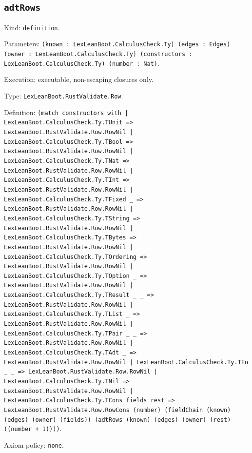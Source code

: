 \documentclass[11pt]{article}
\begin{document}
\subsection*{\texttt{adtRows}}
\noindent Kind: \texttt{definition}.\par
\noindent Parameters: \texttt{(known : LexLeanBoot.CalculusCheck.Ty) (edges : Edges) (owner : LexLeanBoot.CalculusCheck.Ty) (constructors : LexLeanBoot.CalculusCheck.Ty) (number : Nat)}.\par
\noindent Execution: executable, non-escaping closures only.\par
\noindent Type: \texttt{LexLeanBoot.RustValidate.Row}.\par
\noindent Definition: \texttt{(match constructors with | LexLeanBoot.CalculusCheck.Ty.TUnit => LexLeanBoot.RustValidate.Row.RowNil | LexLeanBoot.CalculusCheck.Ty.TBool => LexLeanBoot.RustValidate.Row.RowNil | LexLeanBoot.CalculusCheck.Ty.TNat => LexLeanBoot.RustValidate.Row.RowNil | LexLeanBoot.CalculusCheck.Ty.TInt => LexLeanBoot.RustValidate.Row.RowNil | LexLeanBoot.CalculusCheck.Ty.TFixed \_ => LexLeanBoot.RustValidate.Row.RowNil | LexLeanBoot.CalculusCheck.Ty.TString => LexLeanBoot.RustValidate.Row.RowNil | LexLeanBoot.CalculusCheck.Ty.TBytes => LexLeanBoot.RustValidate.Row.RowNil | LexLeanBoot.CalculusCheck.Ty.TOrdering => LexLeanBoot.RustValidate.Row.RowNil | LexLeanBoot.CalculusCheck.Ty.TOption \_ => LexLeanBoot.RustValidate.Row.RowNil | LexLeanBoot.CalculusCheck.Ty.TResult \_ \_ => LexLeanBoot.RustValidate.Row.RowNil | LexLeanBoot.CalculusCheck.Ty.TList \_ => LexLeanBoot.RustValidate.Row.RowNil | LexLeanBoot.CalculusCheck.Ty.TPair \_ \_ => LexLeanBoot.RustValidate.Row.RowNil | LexLeanBoot.CalculusCheck.Ty.TAdt \_ => LexLeanBoot.RustValidate.Row.RowNil | LexLeanBoot.CalculusCheck.Ty.TFn \_ \_ => LexLeanBoot.RustValidate.Row.RowNil | LexLeanBoot.CalculusCheck.Ty.TNil => LexLeanBoot.RustValidate.Row.RowNil | LexLeanBoot.CalculusCheck.Ty.TCons fields rest => LexLeanBoot.RustValidate.Row.RowCons (number) (fieldChain (known) (edges) (owner) (fields)) (adtRows (known) (edges) (owner) (rest) ((number + 1))))}.\par
\noindent Axiom policy: \texttt{none}.\par
\end{document}
